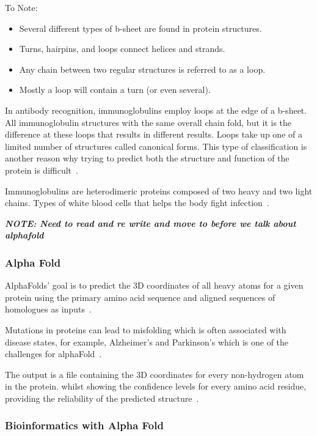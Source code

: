 \documentclass[]{final_report}
\begin{document}
To Note:
\begin{itemize}
    \item Several different types of b-sheet are found in protein structures.
    \item Turns, hairpins, and loops connect helices and strands. 
    \item Any chain between two regular structures is referred to as a loop.
    \item Mostly a loop will contain a turn (or even several).
\end{itemize} 

In antibody recognition, immunoglobulins employ loops at the edge of a b-sheet. All immunoglobulin structures with the same overall chain fold, but it is the difference at these loops that results in different results. Loops take up one of a limited number of structures called canonical forms. This type of classification is another reason why trying to predict both the structure and function of the protein is difficult~\cite{zvelebil_understanding_2008}.

\begin{definition}[Immunoglobulin]
    Immunoglobulins are heterodimeric proteins composed of two heavy and two light chains. Types of white blood cells that helps the body fight infection~\cite{schroeder_structure_2010}.
\end{definition}

\textbf{\textit{NOTE: Need to read and re write and move to before we talk about alphafold}}

\subsubsection{Alpha Fold}

AlphaFolds' goal is to predict the 3D coordinates of all heavy atoms for a given protein using the primary amino acid sequence and aligned sequences of homologues as inputs~\cite{jumper_highly_2021}.

Mutations in proteins can lead to misfolding which is often associated with disease states, for example, Alzheimer’s and Parkinson’s which is one of the challenges for alphaFold~\cite{felix_brief_nodate}.

The output is a file containing the 3D coordinates for every non-hydrogen atom in the protein. whilst showing the confidence levels for every amino acid residue, providing the reliability of the predicted structure~\cite{felix_brief_nodate}.

\subsubsection{Bioinformatics with Alpha Fold}
\end{document}
